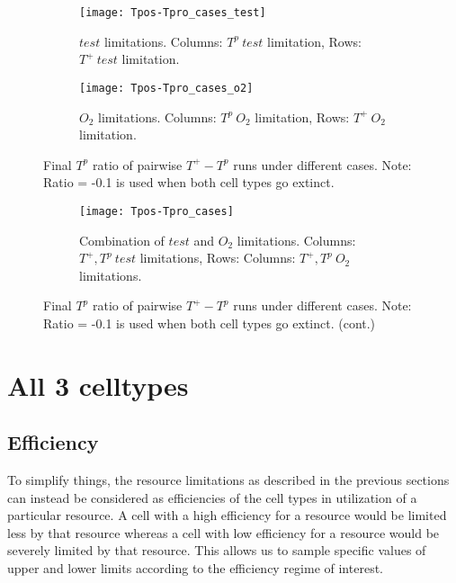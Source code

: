 \begin{figure}[h!]
  \centering
  \begin{subfigure}[b]{\textwidth}
    \centering
    \texttt{[image: Tpos-Tpro\_cases\_test]}
    \caption{$test$ limitations. Columns: $T^p\ test$ limitation, Rows: $T^+\ test$ limitation.}
    \label{fig_Tpos-Tpro_cases_test}
  \end{subfigure}
  \begin{subfigure}[b]{\textwidth}
    \centering
    \texttt{[image: Tpos-Tpro\_cases\_o2]}
    \caption{$O_2$ limitations. Columns: $T^p\ O_2$ limitation, Rows: $T^+\ O_2$ limitation.}
    \label{fig_Tpos-Tpro_cases_o2}
  \end{subfigure}
  \caption[Final $T^p$ ratio of pairwise $T^+ - T^p$ runs under different cases]{Final $T^p$ ratio of pairwise $T^+ - T^p$ runs under different cases. Note: Ratio = -0.1 is used when both cell types go extinct.}
\end{figure}
\begin{figure}[h!]\ContinuedFloat
  \begin{subfigure}[b]{\textwidth}
    \centering
    \texttt{[image: Tpos-Tpro\_cases]}
    \caption{Combination  of $test$ and $O_2$ limitations. Columns: $T^+,T^p\ test$ limitations, Rows: Columns: $T^+,T^p\ O_2$ limitations.}
    \label{fig_Tpos-Tpro_cases_combi}
  \end{subfigure}
  \caption[]{Final $T^p$ ratio of pairwise $T^+ - T^p$ runs under different cases. Note: Ratio = -0.1 is used when both cell types go extinct. (cont.)}
  \label{fig_Tpos-Tpro_cases}
\end{figure}

\newpage

\section{All 3 celltypes}
\subsection{Efficiency}
To simplify things, the resource limitations as described in the previous sections can instead be considered as efficiencies of the cell types in utilization of a particular resource. A cell with a high efficiency for a resource would be limited less by that resource whereas a cell with low efficiency for a resource would be severely limited by that resource. This allows us to sample specific values of upper and lower limits according to the efficiency regime of interest.

